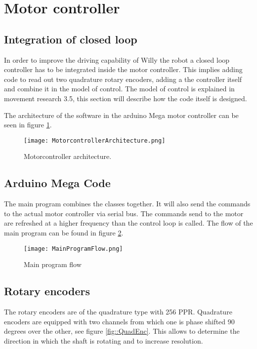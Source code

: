 \section{Motor controller}

\subsection{Integration of closed loop}
In order to improve the driving capability of Willy the robot a closed loop controller has to be integrated inside the motor controller. 
This implies adding code to read out two quadrature rotary encoders, adding a the controller itself and combine it in the model of control.
The model of control is explained in movement research 3.5, this section will describe how the code itself is designed.

The architecture of the software in the arduino Mega motor controller can be seen in figure \ref{fig::Motorconarc}.

\begin{figure}[H]
\centering
\texttt{[image: MotorcontrollerArchitecture.png]}
\caption{Motorcontroller architecture.}
\label{fig::Motorconarc}
\end{figure}

\subsection{Arduino Mega Code}
The main program combines the classes together. It will also send the commands to the actual motor controller via serial bus. The commands send to the motor are refreshed at a higher frequency than the control loop is called. The flow of the main program can be found in figure \ref{fig::MPF}.

\begin{figure}[H]
\centering
\texttt{[image: MainProgramFlow.png]}
\caption{Main program flow}
\label{fig::MPF}
\end{figure}


\subsection{Rotary encoders}
The rotary encoders are of the quadrature type with 256 PPR. 
Quadrature encoders are equipped with two channels from which one is phase shifted 90 degrees over the other, see figure \ref{fig::QuadEnc}.
This allows to determine the direction in which the shaft is rotating and to increase resolution.

